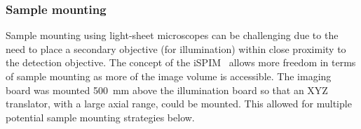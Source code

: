 




\subsubsection{Sample mounting}

Sample mounting using light-sheet microscopes can be challenging due to the need to place a secondary objective (for illumination) within close proximity to the detection objective.
The concept of the \gls{iSPIM}~\cite{wuInvertedSelectivePlane2011a} allows more freedom in terms of sample mounting as more of the image volume is accessible.
The \gls{imaging board} was mounted \SI{500}{\milli\meter} above the \gls{illumination board} so that an XYZ translator, with a large axial range, could be mounted.
This allowed for multiple potential sample mounting strategies below.

